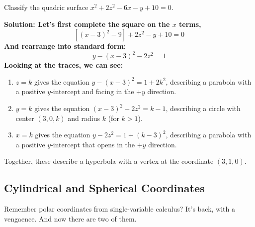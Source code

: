 \begin{example}
    Classify the quadric surface \(x^2+2z^2-6x-y+10=0\).\par\bf{Solution: }Let's first complete the square on the \(x\) terms,
    \[ [(x-3)^2-9] + 2z^2-y+10=0 \]
    And rearrange into standard form:
    \[ y-(x-3)^2-2z^2 = 1\]
    Looking at the traces, we can see:
    \begin{enumerate}
        \item \(z=k\) gives the equation \(y-(x-3)^2=1+2k^2\), describing a parabola with a positive \(y\)-intercept and facing in the \(+y\) direction.
        \item \(y=k\) gives the equation \((x-3)^2+2z^2=k-1\), describing a circle with center \((3, 0, k)\) and radius \(k\) (for \(k>1\)).
        \item \(x=k\) gives the equation \(y-2z^2=1+(k-3)^2\), describing a parabola with a positive \(y\)-intercept that opens in the \(+y\) direction.
    \end{enumerate}
    Together, these describe a hyperbola with a vertex at the coordinate \((3, 1, 0)\).
\end{example}
\subsection{Cylindrical and Spherical Coordinates}
Remember polar coordinates from single-variable calculus? It's back, with a vengaence. And now there are two of them.

